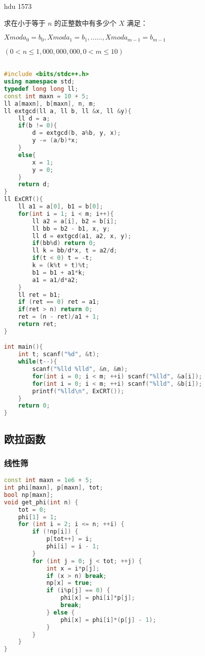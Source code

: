 hdu 1573

求在小于等于 $n$ 的正整数中有多少个 $X$ 满足：

$X mod a_0 = b_0, X mod a_1 = b_1, ...... , X mod a_{m - 1} = b_{m - 1}$

$(0 < n \le 1,000,000,000, 0 < m \le 10)$

\begin{lstlisting}[language=C++]

#include <bits/stdc++.h>
using namespace std;
typedef long long ll;
const int maxn = 10 + 5;
ll a[maxn], b[maxn], n, m;
ll extgcd(ll a, ll b, ll &x, ll &y){
    ll d = a;
    if(b != 0){
        d = extgcd(b, a%b, y, x);
        y -= (a/b)*x;
    }
    else{
        x = 1;
        y = 0;
    }
    return d;
}
ll ExCRT(){
    ll a1 = a[0], b1 = b[0];
    for(int i = 1; i < m; i++){
        ll a2 = a[i], b2 = b[i];
        ll bb = b2 - b1, x, y;
        ll d = extgcd(a1, a2, x, y);
        if(bb%d) return 0;
        ll k = bb/d*x, t = a2/d;
        if(t < 0) t = -t;
        k = (k%t + t)%t;
        b1 = b1 + a1*k;
        a1 = a1/d*a2;
    }
    ll ret = b1;
    if (ret == 0) ret = a1;
    if(ret > n) return 0;
    ret = (n - ret)/a1 + 1;
    return ret;
}

int main(){
    int t; scanf("%d", &t);
    while(t--){
        scanf("%lld %lld", &n, &m);
        for(int i = 0; i < m; ++i) scanf("%lld", &a[i]);
        for(int i = 0; i < m; ++i) scanf("%lld", &b[i]);
        printf("%lld\n", ExCRT());
    }
    return 0;
}
\end{lstlisting}

\subsection{欧拉函数}

\subsubsection{线性筛}

\begin{lstlisting}[language=C++]
const int maxn = 1e6 + 5;
int phi[maxn], p[maxn], tot;
bool np[maxn];
void get_phi(int n) {
    tot = 0;
    phi[1] = 1;
    for (int i = 2; i <= n; ++i) {
        if (!np[i]) {
            p[tot++] = i;
            phi[i] = i - 1;
        }
        for (int j = 0; j < tot; ++j) {
            int x = i*p[j];
            if (x > n) break;
            np[x] = true;
            if (i%p[j] == 0) {
                phi[x] = phi[i]*p[j];
                break;
            } else {
                phi[x] = phi[i]*(p[j] - 1);
            }
        }
    }
}
\end{lstlisting}

